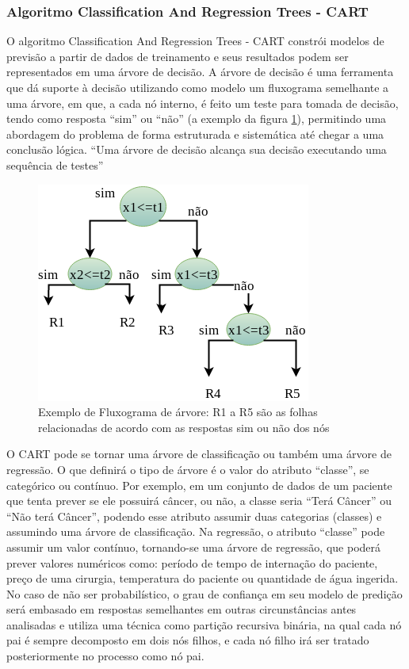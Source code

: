 \subsubsection{Algoritmo Classification And Regression Trees  - CART}\label{cap:refTeor:sssec:cart}


O algoritmo Classification And Regression Trees - CART constrói modelos de previsão a partir de dados de treinamento e seus resultados podem ser representados em uma árvore de decisão. A árvore de decisão é uma ferramenta que dá suporte à decisão utilizando como modelo um fluxograma semelhante a uma árvore, em que, a cada nó interno, é feito um teste para tomada de decisão, tendo como resposta “sim” ou “não” (a exemplo da figura \ref{fig:fluxogramaarvore}), permitindo uma abordagem do problema de forma estruturada e sistemática até chegar a uma conclusão lógica. ``Uma árvore de decisão alcança sua decisão executando uma sequência de testes'' \cite[p. 811]{RusselStuart.Norvig2013}

 \begin{figure}[h!]
    \centering
      \includegraphics[scale=0.5]{figs/arvoredecisao_nos.png}
      \caption{Exemplo de Fluxograma de árvore: R1 a R5 são as folhas relacionadas de acordo com as respostas sim ou não dos nós} \label{fig:fluxogramaarvore}
\end{figure}

O CART pode se tornar uma árvore de classificação ou também uma árvore de regressão. O que definirá o tipo de árvore é o valor do atributo “classe”, se categórico ou contínuo. Por exemplo, em um conjunto de dados de um paciente que tenta prever se  ele possuirá câncer, ou não, a classe seria ``Terá Câncer'' ou ``Não terá Câncer'', podendo esse atributo assumir duas categorias (classes) e assumindo uma árvore de classificação. Na regressão, o atributo ``classe'' pode assumir um valor contínuo, tornando-se uma árvore de regressão, que poderá prever valores numéricos como: período de tempo de internação do paciente, preço de uma cirurgia, temperatura do paciente ou quantidade de água ingerida. No caso de não ser probabilístico, o grau de confiança em seu modelo de predição será embasado em respostas semelhantes em outras circunstâncias antes analisadas e utiliza uma técnica como partição recursiva binária, na qual cada nó pai é sempre decomposto em dois nós filhos, e cada nó filho irá ser tratado posteriormente no processo como nó pai. 

